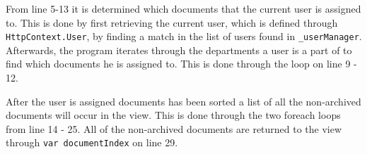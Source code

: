 From line 5-13 it is determined which documents that the current user is assigned to.
This is done by first retrieving the current user, which is defined through \texttt{HttpContext.User}, by finding a match in the list of users found in \texttt{_userManager}.
Afterwards, the program iterates through the departments a user is a part of to find which documents he is assigned to.
This is done through the loop on line 9 - 12.

After the user is assigned documents has been sorted a list of all the non-archived documents will occur in the view.
This is done through the two foreach loops from line 14 - 25.
All of the non-archived documents are returned to the view through \texttt{var documentIndex} on line 29.

